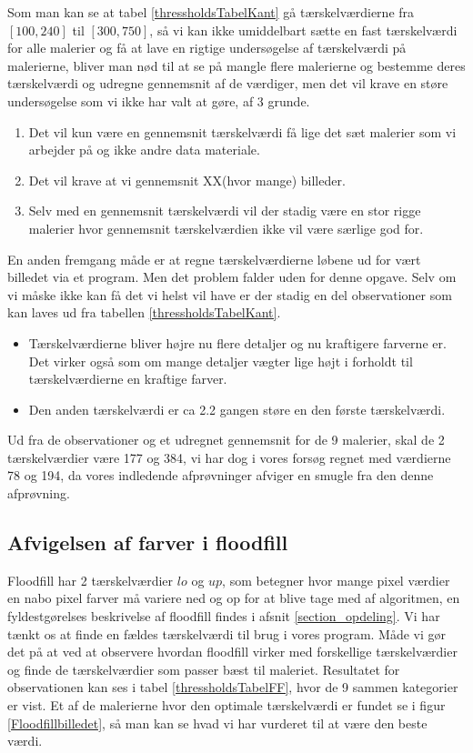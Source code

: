 Som man kan se at tabel \ref{thressholdsTabelKant} gå tærskelværdierne
fra $[100,240]$ til $[300,750]$, så vi kan ikke umiddelbart sætte en
fast tærskelværdi for alle malerier og få at lave en rigtige
undersøgelse af tærskelværdi på malerierne, bliver man nød til at se på
mangle flere malerierne  og bestemme deres tærskelværdi og
udregne gennemsnit af de værdiger, men det vil krave en støre
undersøgelse som vi ikke har valt at gøre, af 3 grunde.

\begin{enumerate}
	\item Det vil kun være en gennemsnit tærskelværdi få lige det sæt
	malerier som vi arbejder på og ikke andre data materiale.
	\item Det vil krave at vi gennemsnit XX(hvor mange) billeder. 
	\item Selv med en gennemsnit tærskelværdi vil der stadig være en stor
	rigge malerier hvor gennemsnit tærskelværdien ikke vil
være særlige god for. 
\end{enumerate}

En anden fremgang måde er at regne tærskelværdierne løbene ud for vært
billedet via et program. Men det problem falder uden for denne opgave.
Selv om vi måske ikke kan få det vi helst vil have er der stadig en del
observationer som kan laves ud fra tabellen \ref{thressholdsTabelKant}. 

\begin{itemize}
	\item Tærskelværdierne bliver højre nu flere detaljer og nu
	kraftigere farverne er. Det virker også som om mange detaljer vægter
	lige højt i forholdt til tærskelværdierne en kraftige farver. 
	\item Den anden tærskelværdi er ca 2.2 gangen støre en den første
	tærskelværdi.
\end{itemize}

Ud fra de observationer og et udregnet gennemsnit for de 9 malerier,
skal de 2 tærskelværdier være 177 og 384, vi har dog i vores forsøg
regnet med værdierne 78 og 194, da vores indledende afprøvninger afviger
en smugle fra den denne afprøvning.

\subsection{Afvigelsen af farver i floodfill}
Floodfill har 2 tærskelværdier $lo$ og $up$, som betegner hvor mange
pixel værdier en nabo pixel farver må variere ned og op for at blive tage med af algoritmen, en
fyldestgørelses beskrivelse af floodfill findes i afsnit
\ref{section_opdeling}. Vi har tænkt os at finde en fældes tærskelværdi til
brug i vores program. Måde vi gør det på at ved at observere hvordan
floodfill virker med forskellige tærskelværdier og finde de
tærskelværdier som passer bæst til maleriet. Resultatet for
observationen kan ses i tabel \ref{thressholdsTabelFF}, hvor de 9 sammen
kategorier er vist. Et af de malerierne hvor den optimale tærskelværdi
er fundet se i figur \ref{Floodfillbilledet}, så man kan se hvad vi har
vurderet til at være den beste værdi.


